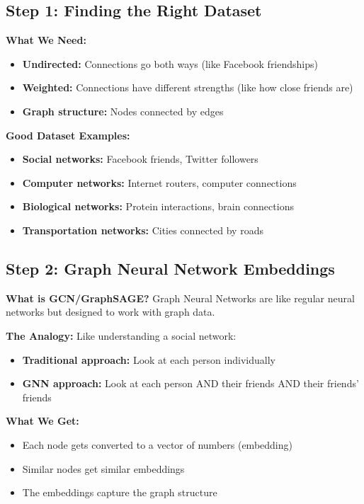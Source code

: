 \documentclass[12pt]{article}
\begin{document}
\subsection{Step 1: Finding the Right Dataset}

\textbf{What We Need:}
\begin{itemize}
    \item \textbf{Undirected:} Connections go both ways (like Facebook friendships)
    \item \textbf{Weighted:} Connections have different strengths (like how close friends are)
    \item \textbf{Graph structure:} Nodes connected by edges
\end{itemize}

\textbf{Good Dataset Examples:}
\begin{itemize}
    \item \textbf{Social networks:} Facebook friends, Twitter followers
    \item \textbf{Computer networks:} Internet routers, computer connections
    \item \textbf{Biological networks:} Protein interactions, brain connections
    \item \textbf{Transportation networks:} Cities connected by roads
\end{itemize}

\subsection{Step 2: Graph Neural Network Embeddings}

\textbf{What is GCN/GraphSAGE?}
Graph Neural Networks are like regular neural networks but designed to work with graph data.

\textbf{The Analogy:} Like understanding a social network:
\begin{itemize}
    \item \textbf{Traditional approach:} Look at each person individually
    \item \textbf{GNN approach:} Look at each person AND their friends AND their friends' friends
\end{itemize}

\textbf{What We Get:}
\begin{itemize}
    \item Each node gets converted to a vector of numbers (embedding)
    \item Similar nodes get similar embeddings
    \item The embeddings capture the graph structure
\end{itemize}
\end{document}
